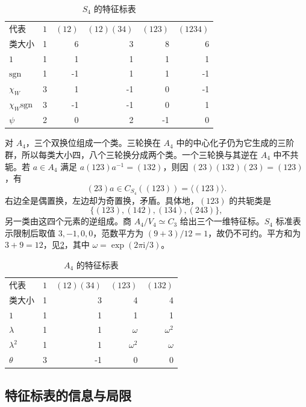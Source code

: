 \begin{table}[htbp]
	\centering
	\caption{\(S_4\) 的特征标表}\label{b5:tab:s4}
	\begin{tabular}{lrrrrr}
		\toprule
		代表&\(1\)&\((12)\)&\((12)(34)\)&\((123)\)&\((1234)\)\\
		类大小&1&6&3&8&6\\
		\midrule
		\(1\)&1&1&1&1&1\\
		\(\mathrm{sgn}\)&1&-1&1&1&-1\\
		\(\chi_W\)&3&1&-1&0&-1\\
		\(\chi_W\mathrm{sgn}\)&3&-1&-1&0&1\\
		\(\psi\)&2&0&2&-1&0\\
		\bottomrule
	\end{tabular}
\end{table}

对 \(A_4\)，三个双换位组成一个类。三轮换在 \(A_4\) 中的中心化子仍为它生成的三阶群，所以每类大小四，八个三轮换分成两个类。一个三轮换与其逆在 \(A_4\) 中不共轭。若 \(a\in A_4\) 满足 \(a(123)a^{-1}=(132)\)，则因 \((23)(132)(23)=(123)\)，有
\[
	(23)a\in C_{S_4}((123))=\langle(123)\rangle.
\]
右边全是偶置换，左边却为奇置换，矛盾。具体地，\((123)\) 的共轭类是
\[
	\{(123),(142),(134),(243)\},
\]
另一类由这四个元素的逆组成。商 \(A_4/V_4\simeq C_3\) 给出三个一维特征标。\(S_4\) 标准表示限制后取值 \(3,-1,0,0\)，范数平方为 \((9+3)/12=1\)，故仍不可约。平方和为 \(3+9=12\)，见\cref{b5:tab:a4}，其中 \(\omega=\exp(2\pi\mathrm i/3)\)。

\begin{table}[htbp]
	\centering
	\caption{\(A_4\) 的特征标表}\label{b5:tab:a4}
	\begin{tabular}{lrrrr}
		\toprule
		代表&\(1\)&\((12)(34)\)&\((123)\)&\((132)\)\\
		类大小&1&3&4&4\\
		\midrule
		\(1\)&1&1&1&1\\
		\(\lambda\)&1&1&\(\omega\)&\(\omega^2\)\\
		\(\lambda^2\)&1&1&\(\omega^2\)&\(\omega\)\\
		\(\theta\)&3&-1&0&0\\
		\bottomrule
	\end{tabular}
\end{table}

\subsection{特征标表的信息与局限}
\label{b5:subsec:0204:03}


